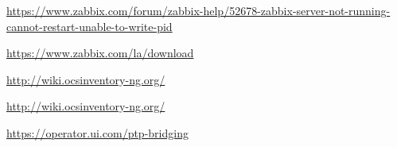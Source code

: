 \begin{thebibliography}{X}

    \bibitem[Zabbix]{} \url{https://www.zabbix.com/forum/zabbix-help/52678-zabbix-server-not-running-cannot-restart-unable-to-write-pid}

\bibitem[Zabbix]{} \url {https://www.zabbix.com/la/download}
    
     \url {http://wiki.ocsinventory-ng.org/}
    
     \url {http://wiki.ocsinventory-ng.org/}
    
    \bibitem[Ubiquiti]{} \url {https://operator.ui.com/ptp-bridging}

\end{thebibliography}	